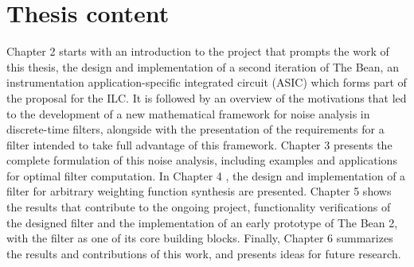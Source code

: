 \section{Thesis content}
Chapter 2 starts with an introduction to the project that prompts the work of this thesis, the design and implementation of a second iteration of The Bean, an instrumentation application-specific integrated circuit (ASIC) which forms part of the proposal for the ILC. It is followed by an overview of the motivations that led to the development of a new mathematical framework for noise analysis in discrete-time filters, alongside with the presentation of the requirements for a filter intended to take full advantage of this framework. Chapter 3 presents the complete formulation of this noise analysis, including examples and applications for optimal filter computation. In Chapter 4 , the design and implementation of a filter for arbitrary weighting function synthesis are presented. Chapter 5 shows the results that contribute to the ongoing project, functionality verifications of the designed filter and the implementation of an early prototype of The Bean 2, with the filter as one of its core building blocks. Finally, Chapter 6 summarizes the results and contributions of this work, and presents ideas for future research.